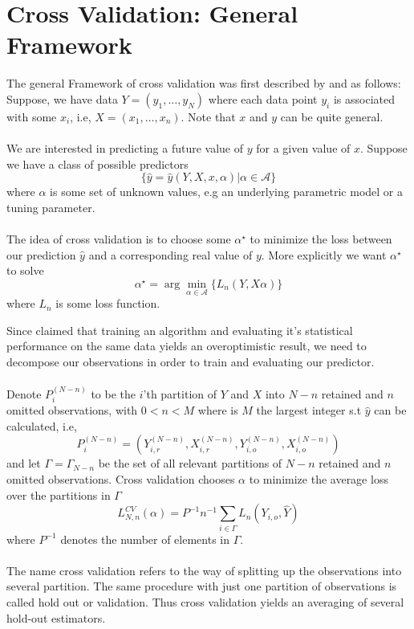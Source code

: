 \documentclass[Research_Module_ES.tex]{subfiles}
\begin{document}
\section{Cross Validation: General Framework}
The general Framework of cross validation was first described by \cite{stone1974cross} and  \cite{geisser1975predictive} as follows: \\

Suppose, we have data $Y=(y_1,\ldots,y_N)$ where each data point $y_i$ is associated with some $x_i$, i.e, $X=(x_1,\ldots,x_n)$. Note that $x$ and $y$ can be quite general.\\
\\
We are interested in predicting a future value of $y$ for a given value of $x$. Suppose we have a class of possible predictors 
\[
	\{\hat{y}=\hat{y}(Y,X,x,\alpha)|\alpha\in\mathscr{A}\}
\]
where $\alpha$ is some set of unknown values, e.g an underlying parametric model or a tuning parameter.\\
\\
The idea of cross validation is to choose some $\alpha^\star$ to minimize the loss between our prediction $\hat{y}$ and a corresponding real value of $y$. More explicitly we want $\alpha^\star$ to solve
\[
	\alpha^\star=\arg\min_{\alpha\in\mathscr{A}}\{L_n(Y,X\alpha)\}
\]
where $L_n$ is some loss function.
 
Since \cite{larson1931shrinkage} claimed that training an algorithm and evaluating it's statistical performance on the same data yields an overoptimistic result, we need to decompose our observations in order to train and evaluating our predictor. \\
\\
Denote $P^{(N-n)}_i$ to be the $i$'th partition of $Y$ and $X$ into $N-n$ retained and $n$ omitted observations, with $0<n<M$ where is $M$ the largest integer s.t $\hat{y}$ can be calculated, i.e,
\[
	P^{(N-n)}_i=(Y_{i,r}^{(N-n)},X_{i,r}^{(N-n)},Y_{i,o}^{(N-n)},X_{i,o}^{(N-n)})
\]
and let $\Gamma=\Gamma_{N-n}$ be the set of all relevant partitions of $N-n$ retained and $n$ omitted observations. Cross validation chooses $\alpha$ to minimize the average loss over the partitions in $\Gamma$ 
\[
	L_{N,n}^{CV}(\alpha)=P^{-1}n^{-1}\sum_{i\in\Gamma}L_n(Y_{i,o},\hat{Y})
\]
where $P^{-1}$ denotes the number of elements in $\Gamma$.\\
\\
The name cross validation refers to the way of splitting up the observations into several partition. The same procedure with just one partition of observations is called hold out or validation. Thus cross validation yields an averaging of several hold-out estimators.
\end{document}

